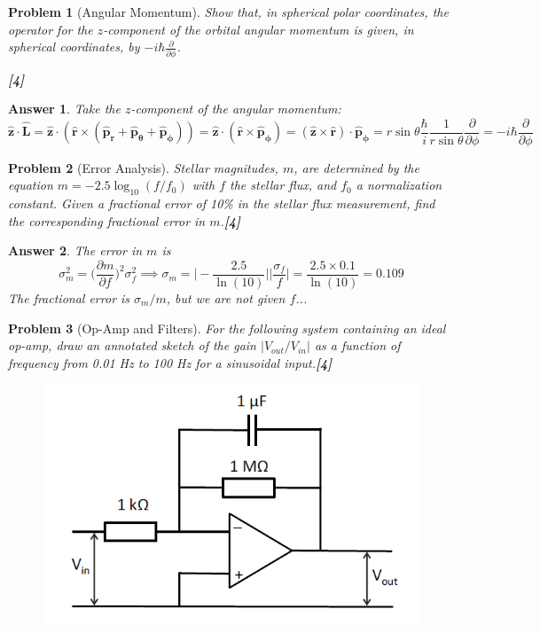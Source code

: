 \documentclass[a4paper]{article}
\newtheorem{ans}{Answer}[subsection]
\theoremstyle{new}
\newtheorem{qns}{Problem}[subsection]
\begin{document}
\begin{qns}[Angular Momentum]
Show that, in spherical polar coordinates, the operator for the $z$-component of the orbital angular momentum is given, in spherical coordinates, by $-i\hbar\frac{\partial}{\partial\phi}$.

\hfill\textbf{[4]}
\end{qns}
\begin{ans}
Take the $z$-component of the angular momentum:
$$\mathbf{\hat{z}}\cdot\mathbf{\hat{L}}=\mathbf{\hat{z}}\cdot(\mathbf{\hat{r}}\times(\mathbf{\hat{p}_r}+\mathbf{\hat{p}_\theta}+\mathbf{\hat{p}_\phi}))=\mathbf{\hat{z}}\cdot(\mathbf{\hat{r}}\times\mathbf{\hat{p}_\phi})=(\mathbf{\hat{z}}\times\mathbf{\hat{r}})\cdot\mathbf{\hat{p}_\phi}=r\sin\theta\frac{\hbar}{i}\frac{1}{r\sin\theta}\frac{\partial}{\partial\phi}=-i\hbar\frac{\partial}{\partial\phi}$$
\end{ans}
\newpage
\begin{qns}[Error Analysis]
Stellar magnitudes, $m$, are determined by the equation $m=-2.5\log_{10}(f/f_0)$ with $f$ the stellar flux, and $f_0$ a normalization constant. Given a fractional error of 10\% in the stellar flux measurement, find the corresponding fractional error in $m$.\hfill\textbf{[4]}
\end{qns}
\begin{ans}
The error in $m$ is
$$\sigma_m^2=\bigg(\frac{\partial m}{\partial f}\bigg)^2\sigma_f^2\implies\sigma_m=\bigg|-\frac{2.5}{\ln(10)}\bigg|\bigg|\frac{\sigma_f}{f}\bigg|=\frac{2.5\times0.1}{\ln(10)}=0.109$$
The fractional error is $\sigma_m/m$, but we are not given $f$...
\end{ans}
\begin{qns}[Op-Amp and Filters]
For the following system containing an ideal op-amp, draw an annotated sketch of the gain $|V_{out}/V_{in}|$ as a function of frequency from 0.01 Hz to 100 Hz for a sinusoidal input.\hfill\textbf{[4]}
\end{qns}
\begin{figure}[H]
    \centering
    \includegraphics[scale=0.75]{2015P1A5Q.PNG}
\end{figure}
\end{document}
